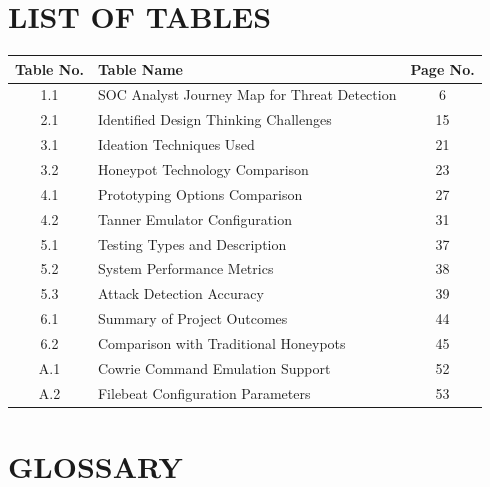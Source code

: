 \documentclass[12pt,a4paper]{report}
\begin{document}
\chapter*{LIST OF TABLES}
\thispagestyle{plain}

\begin{center}
\begin{tabular}{|c|p{9cm}|c|}
\hline
\textbf{Table No.} & \textbf{Table Name} & \textbf{Page No.} \\
\hline
1.1 & SOC Analyst Journey Map for Threat Detection & 6 \\
\hline
2.1 & Identified Design Thinking Challenges & 15 \\
\hline
3.1 & Ideation Techniques Used & 21 \\
\hline
3.2 & Honeypot Technology Comparison & 23 \\
\hline
4.1 & Prototyping Options Comparison & 27 \\
\hline
4.2 & Tanner Emulator Configuration & 31 \\
\hline
5.1 & Testing Types and Description & 37 \\
\hline
5.2 & System Performance Metrics & 38 \\
\hline
5.3 & Attack Detection Accuracy & 39 \\
\hline
6.1 & Summary of Project Outcomes & 44 \\
\hline
6.2 & Comparison with Traditional Honeypots & 45 \\
\hline
A.1 & Cowrie Command Emulation Support & 52 \\
\hline
A.2 & Filebeat Configuration Parameters & 53 \\
\hline
\end{tabular}
\end{center}

\chapter*{GLOSSARY}
\thispagestyle{plain}
\end{document}
